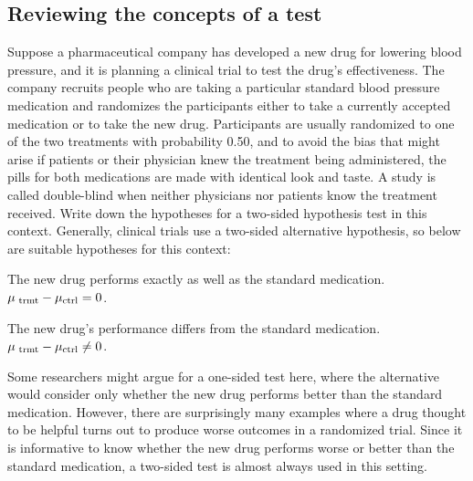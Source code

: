 \subsection{Reviewing the concepts of a test}

\begin{example}{Suppose a pharmaceutical company has developed a new drug for lowering blood pressure, and it is planning a clinical trial to test the drug's effectiveness. The company recruits people who are taking a particular standard blood pressure medication and randomizes the participants either to take a currently accepted medication or to take the new drug.  Participants are usually randomized to one of the two treatments with probability 0.50, and to avoid the bias that might arise if patients or their physician knew the treatment being administered, the pills for both medications are made with identical look and taste. A study is called double-blind when neither physicians nor patients know the treatment received. Write down the hypotheses for a two-sided hypothesis test in this context.}
Generally, clinical trials use a two-sided alternative hypothesis, so below are suitable hypotheses for this context:
\begin{description}
\setlength{\itemsep}{0mm}
\item[$H_0$:] The new drug performs exactly as well as the standard medication. \\
  $\mu_{\text{ \text{trmt}}} - \mu_{\text{ctrl}} = 0$.
\item[$H_A$:] The new drug's performance differs from the standard medication. \\
  $\mu_{\text{ \text{trmt}}} - \mu_{\text{ctrl}} \neq 0$.
\end{description}
Some researchers might argue for a one-sided test here, where the alternative would consider only whether the new drug performs better than the standard medication. However, there are surprisingly many examples where a drug thought to be helpful turns out to produce worse outcomes in a randomized trial. Since it is informative to know whether the new drug performs worse or better than the standard medication, a two-sided test is almost always used in this setting. 
\end{example}


